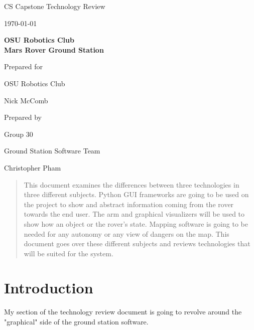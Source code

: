 \documentclass[onecolumn, draftclsnofoot, 10pt, compsoc]{IEEEtran}
\def \CapstoneTeamName{			Ground Station Software Team}
\def \CapstoneTeamNumber{		30}
\def \GroupMemberOne{			Christopher Pham}
\def \GroupMemberTwo{}
\def \GroupMemberThree{}
\def \CapstoneProjectName{		OSU Robotics Club\\Mars Rover Ground Station}
\def \CapstoneSponsorCompany{	OSU Robotics Club}
\def \CapstoneSponsorPerson{	Nick McComb}
\def \DocType{	%
				Technology Review
			 }
\newcommand{\NameSigPair}[1]{
  \par
  \makebox[2.75in][r]{#1} 
  \hfill
  \makebox[3.25in]{
      \makebox[2.25in]{\hrulefill} 
      \hfill
      \makebox[.75in]{\hrulefill}
  }
  \par\vspace{-12pt} 
  \textit{
      \tiny\noindent
      \makebox[2.75in]{} 
      \hfill
      \makebox[3.25in]{
          \makebox[2.25in][r]{Signature} 
          \hfill
          \makebox[.75in][r]{Date}
      }
  }
}
\renewcommand{\NameSigPair}[1]{#1}
\begin{document}
\begin{titlepage}
\begin{singlespace}
		\par\vspace{.35in}
		\centering
		\scshape{
			\huge CS Capstone \DocType \par
			{\large\today}\par
			\vspace{.5in}
			\textbf{\Huge\CapstoneProjectName}\par
			\vfill
			{\large Prepared for}\par
			\Huge \CapstoneSponsorCompany\par
			\vspace{5pt}
			{\Large\NameSigPair{\CapstoneSponsorPerson}\par}
			{\large Prepared by }\par
			Group\CapstoneTeamNumber\par
			\CapstoneTeamName\par 
			\vspace{5pt}
			{\Large
				\NameSigPair{\GroupMemberOne}\par
				\NameSigPair{\GroupMemberTwo}\par
				\NameSigPair{\GroupMemberThree}\par
			}
			\vspace{20pt}
            \begin{abstract}
            This document examines the differences between three technologies in three different subjects.
            Python GUI frameworks are going to be used on the project to show and abstract information coming from the rover towards the end user.
            The arm and graphical visualizers will be used to show how an object or the rover's state.
            Mapping software is going to be needed for any autonomy or any view of dangers on the map.
            This document goes over these different subjects and reviews technologies that will be suited for the system.

		\end{abstract}
		}
	\end{singlespace}
\end{titlepage}
\newpage
{}
\tableofcontents
\clearpage

\section{Introduction}
My section of the technology review document is going to revolve around the "graphical" side of the ground station software. 
\end{document}
